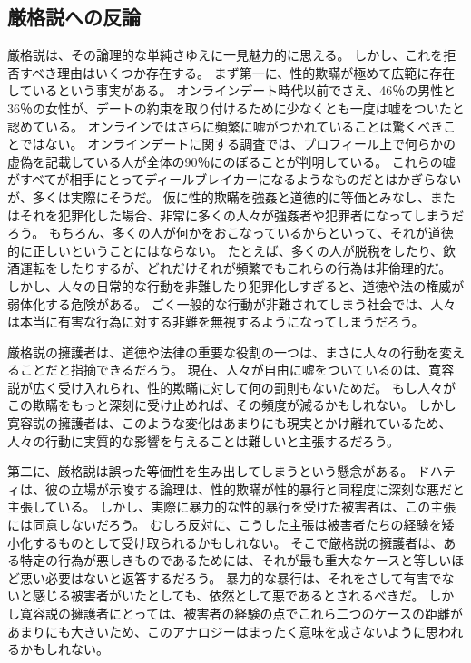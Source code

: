 \documentclass[paper=a4,book,openany]{jlreq} \usepackage{mystyle}
\begin{document}
\subsection{厳格説への反論}

厳格説は、その論理的な単純さゆえに一見魅力的に思える。
しかし、これを拒否すべき理由はいくつか存在する。
まず第一に、性的欺瞞が極めて広範に存在しているという事実がある。
オンラインデート時代以前でさえ、46％の男性と36％の女性が、デートの約束を取り付けるために少なくとも一度は嘘をついたと認めている\citep{rowatt99:_lying_get_date}。
オンラインではさらに頻繁に嘘がつかれていることは驚くべきことではない。
オンラインデートに関する調査では、プロフィール上で何らかの虚偽を記載している人が全体の90％にのぼることが判明している\citep{hancock07:_truth_lying_onlin_datin_profil}。
これらの嘘がすべてが相手にとってディールブレイカーになるようなものだとはかぎらないが、多くは実際にそうだ。
仮に性的欺瞞を強姦と道徳的に等価とみなし、またはそれを犯罪化した場合、非常に多くの人々が強姦者や犯罪者になってしまうだろう。
もちろん、多くの人が何かをおこなっているからといって、それが道徳的に正しいということにはならない。
たとえば、多くの人が脱税をしたり、飲酒運転をしたりするが、どれだけそれが頻繁でもこれらの行為は非倫理的だ。
しかし、人々の日常的な行動を非難したり犯罪化しすぎると、道徳や法の権威が弱体化する危険がある。
ごく一般的な行動が非難されてしまう社会では、人々は本当に有害な行為に対する非難を無視するようになってしまうだろう。

厳格説の擁護者は、道徳や法律の重要な役割の一つは、まさに人々の行動を変えることだと指摘できるだろう。
現在、人々が自由に嘘をついているのは、寛容説が広く受け入れられ、性的欺瞞に対して何の罰則もないためだ。
もし人々がこの欺瞞をもっと深刻に受け止めれば、その頻度が減るかもしれない。
しかし寛容説の擁護者は、このような変化はあまりにも現実とかけ離れているため、人々の行動に実質的な影響を与えることは難しいと主張するだろう。

第二に、厳格説は誤った等価性を生み出してしまうという懸念がある。
ドハティは、彼の立場が示唆する論理は、性的欺瞞が性的暴行と同程度に深刻な悪だと主張している。
しかし、実際に暴力的な性的暴行を受けた被害者は、この主張には同意しないだろう。
むしろ反対に、こうした主張は被害者たちの経験を矮小化するものとして受け取られるかもしれない。
そこで厳格説の擁護者は、ある特定の行為が悪しきものであるためには、それが最も重大なケースと等しいほど悪い必要はないと返答するだろう。
暴力的な暴行は、それをさして有害でないと感じる被害者がいたとしても、依然として悪であるとされるべきだ。
しかし寛容説の擁護者にとっては、被害者の経験の点でこれら二つのケースの距離があまりにも大きいため、このアナロジーはまったく意味を成さないように思われるかもしれない。
\end{document}
